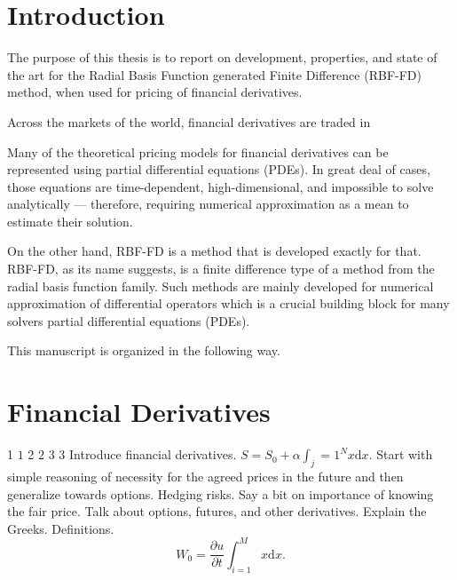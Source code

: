 \documentclass{UUThesisTemplate}
\begin{document}

\mainmatter
%    
%    
%    

%    
%
%
\chapter{Introduction}
\label{ch:intro}
\par
The purpose of this thesis is to report on development, properties, and state of the art for the Radial Basis Function generated Finite Difference (RBF-FD) method, when used for pricing of financial derivatives. 
\par
Across the markets of the world, financial derivatives are traded in 
\par
Many of the theoretical pricing models for financial derivatives can be represented using partial differential equations (PDEs). In great deal of cases, those equations are time-dependent, high-dimensional, and impossible to solve analytically --- therefore, requiring numerical approximation as a mean to estimate their solution.  
\par
On the other hand, RBF-FD is a method that is developed exactly for that. RBF-FD, as its name suggests, is a finite difference type of a method from the radial basis function family. Such methods are mainly developed for numerical approximation of differential operators which is a crucial building block for many solvers partial differential equations (PDEs). 
\par
This manuscript is organized in the following way. 
\chapter{Financial Derivatives}
\label{ch:finder}
1 $1$ 2 $2$ 3 $3$
Introduce financial derivatives. $S=S_0+\alpha \int_j=1^Nx \mathrm{d}x$. Start with simple reasoning of necessity for the agreed prices in the future and then generalize towards options. Hedging risks. Say a bit on importance of knowing the fair price. Talk about options, futures, and other derivatives. Explain the Greeks. Definitions.
\begin{equation}
W_{0} = \frac{\partial u}{\partial t} \int_{i=1}^{M} x \mathrm{d}x.
\end{equation}
\end{document}
